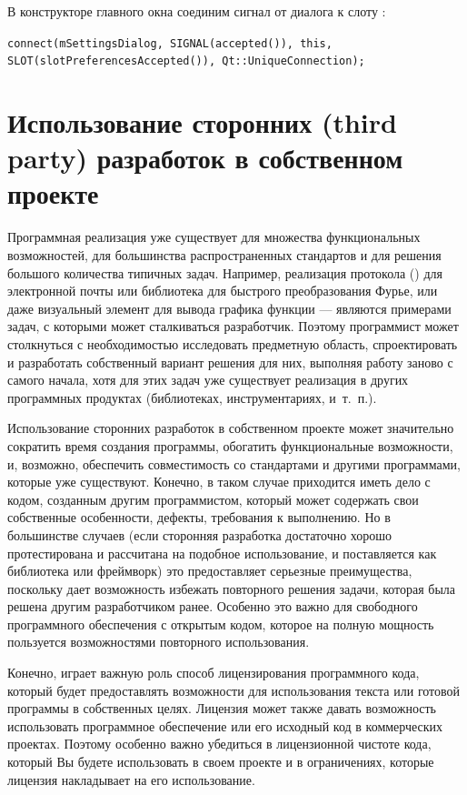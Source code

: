 В конструкторе главного окна соединим сигнал  от диалога к слоту
:

\lstinline!connect(mSettingsDialog, SIGNAL(accepted()), this, SLOT(slotPreferencesAccepted()), Qt::UniqueConnection);!

\section[Использование сторонних разработок в собственном проекте]{Использование сторонних (third party) разработок в собственном проекте}
Программная реализация уже существует для множества функциональных возможностей, для большинства распространенных
стандартов и для решения большого количества типичных задач. Например, 
реализация протокола  () для электронной почты или 
библиотека для быстрого преобразования Фурье, или даже визуальный элемент для
вывода графика функции --- являются примерами задач, с которыми может сталкиваться разработчик. Поэтому программист может
столкнуться с необходимостью исследовать предметную область, спроектировать и разработать собственный вариант решения
для них, выполняя работу заново с самого начала, хотя для этих задач уже существует реализация в других программных
продуктах (библиотеках, инструментариях, и~т.~п.). 

Использование сторонних разработок в собственном проекте может значительно сократить время создания программы, обогатить
функциональные возможности, и, возможно, обеспечить совместимость со стандартами и другими программами, которые уже
существуют. Конечно, в таком случае приходится иметь дело с кодом, созданным другим программистом, который может
содержать свои собственные особенности, дефекты, требования к выполнению. Но в большинстве случаев (если сторонняя
разработка достаточно хорошо протестирована и рассчитана на подобное использование, и поставляется  как библиотека или
фреймворк) это предоставляет серьезные преимущества, поскольку дает возможность избежать повторного решения задачи,
которая была решена другим разработчиком ранее. Особенно это важно для свободного программного обеспечения с открытым
кодом, которое на полную мощность пользуется возможностями повторного использования. 

Конечно, играет важную роль способ лицензирования программного кода, который будет предоставлять возможности для
использования текста или готовой программы в собственных целях. Лицензия может также давать возможность использовать
программное обеспечение или его исходный код в коммерческих проектах. Поэтому особенно важно убедиться в лицензионной
чистоте кода, который Вы будете использовать в своем проекте и в ограничениях, которые лицензия накладывает на его
использование.

